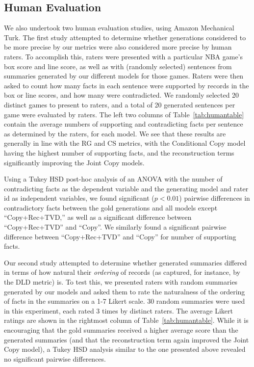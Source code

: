 \documentclass[11pt,letterpaper]{article}
\begin{document}
\subsection{Human Evaluation}
We also undertook two human evaluation studies, using Amazon Mechanical Turk. The first study attempted to determine whether generations considered to be more precise by our metrics were also considered more precise by human raters. To accomplish this, raters were presented with a particular NBA game's box score and line score, as well as with (randomly selected) sentences from summaries generated by our different models for those games. Raters were then asked to count how many facts in each sentence were supported by records in the box or line scores, and how many were contradicted. We randomly selected 20 distinct games to present to raters, and a total of 20 generated sentences per game were evaluated by raters. The left two columns of Table~\ref{tab:humantable} contain the average numbers of supporting and contradicting facts per sentence as determined by the raters, for each model. We see that these results are generally in line with the RG and CS metrics, with the Conditional Copy model having the highest number of supporting facts, and the reconstruction terms significantly improving the Joint Copy models.

Using a Tukey HSD post-hoc analysis of an ANOVA with the number of contradicting facts as the dependent variable and the generating model and rater id as independent variables, we found significant ($p < 0.01$) pairwise differences in contradictory facts between the gold generations and all models except ``Copy+Rec+TVD,'' as well as a significant difference between ``Copy+Rec+TVD'' and ``Copy''. We similarly found a significant pairwise difference between ``Copy+Rec+TVD'' and ``Copy'' for number of supporting facts.

Our second study attempted to determine whether generated summaries differed in terms of how natural their \textit{ordering} of records (as captured, for instance, by the DLD metric) is. To test this, we presented raters with random summaries generated by our models and asked them to rate the naturalness of the ordering of facts in the summaries on a 1-7 Likert scale. 30 random summaries were used in this experiment, each rated 3 times by distinct raters. The average Likert ratings are shown in the rightmost column of Table~\ref{tab:humantable}. While it is encouraging that the gold summaries received a higher average score than the generated summaries (and that the reconstruction term again improved the Joint Copy model), a Tukey HSD analysis similar to the one presented above revealed no significant pairwise differences.
\end{document}
